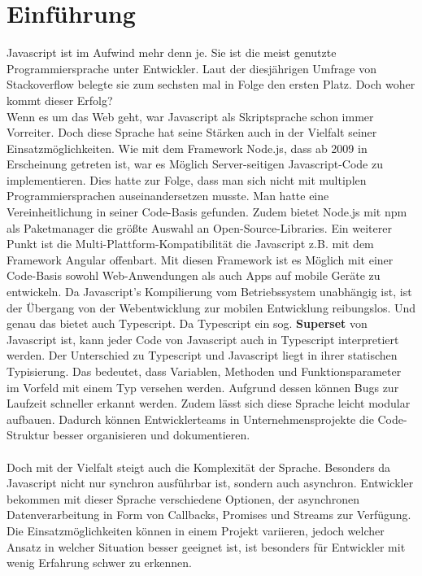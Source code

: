 \setcounter{secnumdepth}{1}

\section{Einführung}

Javascript ist im Aufwind mehr denn je. Sie ist die meist genutzte Programmiersprache unter Entwickler. Laut der diesjährigen Umfrage von Stackoverflow belegte sie zum sechsten mal in Folge den ersten Platz.\cite{programming-language-survey} Doch woher kommt dieser Erfolg? \\
Wenn es um das Web geht, war Javascript als Skriptsprache schon immer Vorreiter. Doch diese Sprache hat seine Stärken auch in der Vielfalt seiner Einsatzmöglichkeiten. Wie mit dem Framework Node.js, dass ab 2009 in Erscheinung getreten ist, war es Möglich Server-seitigen Javascript-Code zu implementieren. Dies hatte zur Folge, dass man sich nicht mit multiplen Programmiersprachen auseinandersetzen musste. Man hatte eine Vereinheitlichung in seiner Code-Basis gefunden. Zudem bietet Node.js mit npm als Paketmanager die größte Auswahl an Open-Source-Libraries. Ein weiterer Punkt ist die Multi-Plattform-Kompatibilität die Javascript z.B. mit dem Framework Angular offenbart. Mit diesen Framework ist es Möglich mit einer Code-Basis sowohl Web-Anwendungen als auch Apps auf mobile Geräte zu entwickeln. Da Javascript's Kompilierung vom Betriebssystem unabhängig ist, ist der Übergang von der Webentwicklung zur mobilen Entwicklung reibungslos. Und genau das bietet auch Typescript. Da Typescript ein sog. \textbf{Superset} von Javascript ist, kann jeder Code von Javascript auch in Typescript interpretiert werden. Der Unterschied zu Typescript und Javascript liegt in ihrer statischen Typisierung. Das bedeutet, dass Variablen, Methoden und Funktionsparameter im Vorfeld mit einem Typ versehen werden. Aufgrund dessen können Bugs zur Laufzeit schneller erkannt werden. Zudem lässt sich diese Sprache leicht modular aufbauen. Dadurch können Entwicklerteams in Unternehmensprojekte die Code-Struktur besser organisieren und dokumentieren.\\\\

\noindent
Doch mit der Vielfalt steigt auch die Komplexität der Sprache. Besonders da Javascript nicht nur synchron ausführbar ist, sondern auch asynchron. Entwickler bekommen mit dieser Sprache verschiedene Optionen, der asynchronen Datenverarbeitung in Form von Callbacks, Promises und Streams zur Verfügung. Die Einsatzmöglichkeiten können in einem Projekt variieren, jedoch welcher Ansatz in welcher Situation besser geeignet ist, ist besonders für Entwickler mit wenig Erfahrung schwer zu erkennen.

